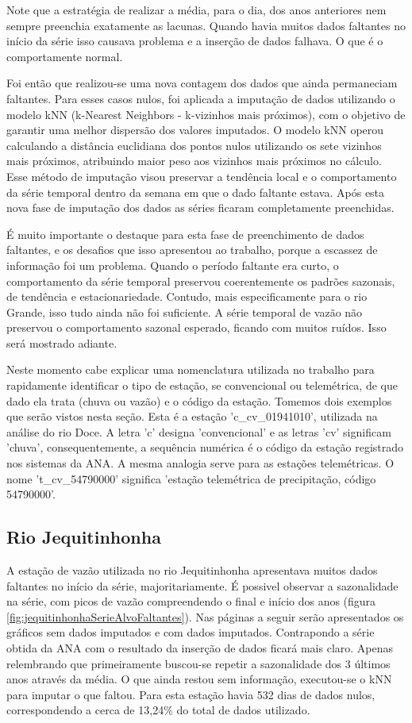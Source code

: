 Note que a estratégia de realizar a média, para o dia, dos anos anteriores nem sempre preenchia exatamente as lacunas. Quando havia muitos dados faltantes no início da série isso causava problema e a inserção de dados falhava. O que é o comportamente normal.

Foi então que realizou-se uma nova contagem dos dados que ainda permaneciam faltantes. Para esses casos nulos, foi aplicada a imputação de dados utilizando o modelo kNN (k-Nearest Neighbors - k-vizinhos mais próximos), com o objetivo de garantir uma melhor dispersão dos valores imputados. O modelo kNN operou calculando a distância euclidiana dos pontos nulos utilizando os sete vizinhos mais próximos, atribuindo maior peso aos vizinhos mais próximos no cálculo. Esse método de imputação visou preservar a tendência local e o comportamento da série temporal dentro da semana em que o dado faltante estava. Após esta nova fase de imputação dos dados as séries ficaram completamente preenchidas.

É muito importante o destaque para esta fase de preenchimento de dados faltantes, e os desafios que isso apresentou ao trabalho, porque a escassez de informação foi um problema. Quando o período faltante era curto, o comportamento da série temporal preservou coerentemente os padrões sazonais, de tendência e estacionariedade. Contudo, mais especificamente para o rio Grande, isso tudo ainda não foi suficiente. A série temporal de vazão não preservou o comportamento sazonal esperado, ficando com muitos ruídos. Isso será mostrado adiante.

Neste momento cabe explicar uma nomenclatura utilizada no trabalho para rapidamente identificar o tipo de estação, se convencional ou telemétrica, de que dado ela trata (chuva ou vazão) e o código da estação. Tomemos dois exemplos que serão vistos nesta seção. Esta é a estação 'c\_cv\_01941010', utilizada na análise do rio Doce. A letra 'c' designa 'convencional' e as letras 'cv' significam 'chuva', consequentemente, a sequência numérica é o código da estação registrado nos sistemas da ANA. A mesma analogia serve para as estações telemétricas. O nome 't\_cv\_54790000' significa 'estação telemétrica de precipitação, código 54790000'.

\subsection{Rio Jequitinhonha}

A estação de vazão utilizada no rio Jequitinhonha apresentava muitos dados faltantes no início da série, majoritariamente. É possivel observar a sazonalidade na série, com picos de vazão compreendendo o final e início dos anos (figura \ref{fig:jequitinhonhaSerieAlvoFaltantes}). Nas páginas a seguir serão apresentados os gráficos sem dados imputados e com dados imputados. Contrapondo a série obtida da ANA com o resultado da inserção de dados ficará mais claro. Apenas relembrando que primeiramente buscou-se repetir a sazonalidade dos 3 últimos anos através da média. O que ainda restou sem informação, executou-se o kNN para imputar o que faltou. Para esta estação havia 532 dias de dados nulos, correspondendo a cerca de 13,24\% do total de dados utilizado.

